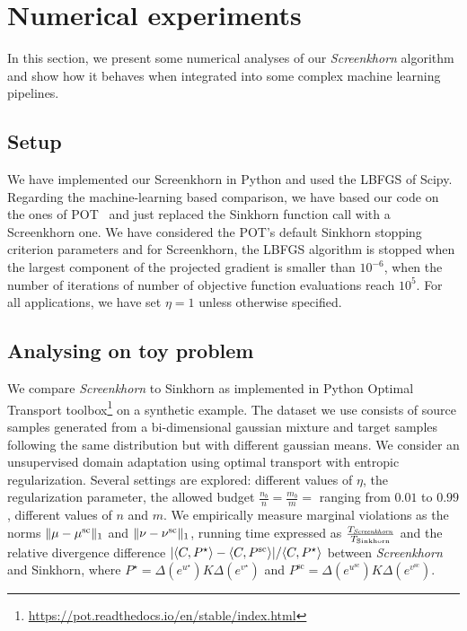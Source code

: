 
\section{Numerical experiments} %
\label{sec:numerical_experiments}

In this section, we present some numerical analyses of our
\emph{Screenkhorn} algorithm and show how it behaves when
integrated into some complex machine learning pipelines.

\subsection{Setup}

We have implemented our Screenkhorn in Python and used the LBFGS of
Scipy. Regarding the machine-learning based comparison, we have based our code
on the ones of POT~\citep{flamary2017pot} and just replaced the Sinkhorn function call with a Screenkhorn one. We have considered the POT's default Sinkhorn stopping criterion parameters and for Screenkhorn, the LBFGS algorithm is stopped when the 
largest component of the projected gradient is smaller than $10^{-6}$, when the number of iterations of number of objective function evaluations reach $10^{5}$. For all applications, we have set $\eta=1$ unless otherwise specified.

\subsection{Analysing on toy problem}

We compare \emph{Screenkhorn} to Sinkhorn as implemented in Python Optimal Transport toolbox\footnote{\url{https://pot.readthedocs.io/en/stable/index.html}} on  a synthetic example. The dataset we use consists of source samples generated from a bi-dimensional gaussian mixture and target samples following the same distribution but with different gaussian means. We consider an unsupervised domain adaptation using optimal transport with entropic regularization.  Several settings are explored: different values of $\eta$, the regularization parameter, the allowed budget $\frac{n_b}{n} = \frac{m_b}{m} = $ ranging from $0.01$ to $0.99$, different values of $n$ and $m$.
 We empirically measure  marginal violations as the norms $\|{\mu} -{\mu}^{\text{sc}}\|_1$ and $\|{\nu} -{\nu}^{\text{sc}}\|_1$, running time expressed as $\frac{T_{\text{\emph{Screenkhorn}}}}{T_{\text{Sinkhorn}}}$ and the relative divergence difference $| \langle C, P^\star \rangle - \langle C, P^{\text{sc}} \rangle|/\langle C, P^\star \rangle$ between \emph{Screenkhorn} and Sinkhorn, where $P^\star = \Delta(e^{u^\star}) K \Delta(e^{v^\star})$ and $P^{\text{sc}} = \Delta(e^{u^{\text{sc}}}) K \Delta(e^{v^{\text{sc}}}).$

